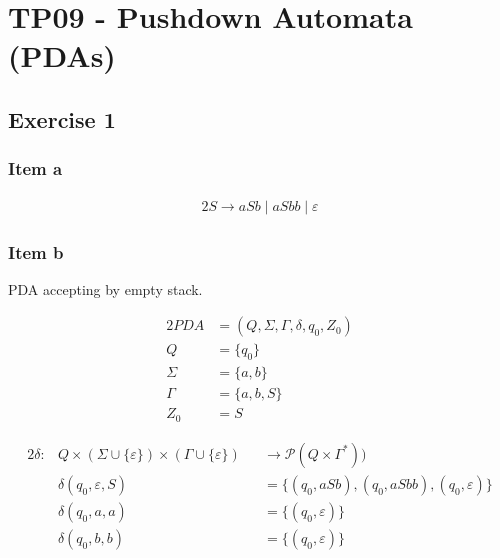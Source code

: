 \documentclass[docid=TP09]{tcom_TP}
\begin{document}
\setcounter{section}{8}
\section{TP09 - Pushdown Automata (PDAs)}
{
\renewcommand{\thesubsubsection}{\thesubsection\alph{subsubsection}}
\subsection{Exercise 1}
\subsubsection{Item a}
\begin{alignat*}{2}
	S \rightarrow aSb\mid aSbb\mid \varepsilon
\end{alignat*}
\subsubsection{Item b} \label{TP09_1b}
PDA accepting by empty stack.
\begin{center}
\begin{minipage}[c]{0.30\textwidth}
\begin{alignat*}{2}
	PDA    &= (Q, \Sigma, \Gamma, \delta, q_0, Z_0)\\
	Q      &= \{q_0\}\\
	\Sigma &= \{a,b\}\\
	\Gamma &= \{a,b,S\}\\
	Z_0    &= S
\end{alignat*}
\end{minipage}%
\begin{minipage}[c]{0.65\textwidth}
\begin{alignat*}{2}
	\delta \colon & Q \times (\Sigma \cup \{\varepsilon\}) \times (\Gamma \cup \{\varepsilon\}) &&\rightarrow \mathscr{P}(Q \times \Gamma^*))\\
	&\delta(q_0, \varepsilon, S) &&=\{(q_0, aSb), (q_0, aSbb), (q_0, \varepsilon)\}\\
	&\delta(q_0, a, a) &&= \{(q_0, \varepsilon)\}\\
	&\delta(q_0, b, b) &&= \{(q_0, \varepsilon)\}
\end{alignat*}
\end{minipage}
\end{center}
}
\end{document}
